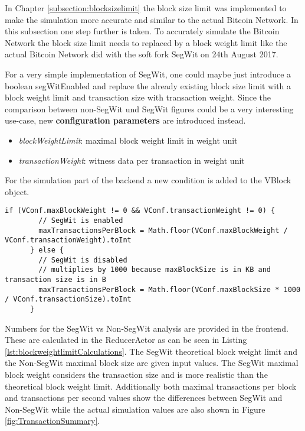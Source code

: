 In Chapter \ref{subsection:blocksizelimit} the block size limit was implemented to make the simulation more accurate and similar to the actual Bitcoin Network. In this subsection one step further is taken. To accurately simulate the Bitcoin Network the block size limit needs to replaced by a block weight limit like the actual Bitcoin Network did with the soft fork SegWit on 24th August 2017.

For a very simple implementation of SegWit, one could maybe just introduce a boolean segWitEnabled and replace the already existing block size limit with a block weight limit and transaction size with transaction weight. Since the comparison between non-SegWit und SegWit figures could be a very interesting use-case, new \textbf{configuration parameters} are introduced instead.

\begin{itemize}
\item \textit{blockWeightLimit}: maximal block weight limit in weight unit
\item \textit{transactionWeight}: witness data per transaction in weight unit
\end{itemize}

For the simulation part of the backend a new condition is added to the VBlock object.

\begin{minipage}{\linewidth}
\begin{lstlisting}[style=myScalastyle,label=lst:blockweightlimit,caption={VBlock with focus on block weight limit}]
      if (VConf.maxBlockWeight != 0 && VConf.transactionWeight != 0) {
        // SegWit is enabled
        maxTransactionsPerBlock = Math.floor(VConf.maxBlockWeight / VConf.transactionWeight).toInt
      } else {
        // SegWit is disabled
        // multiplies by 1000 because maxBlockSize is in KB and transaction size is in B
        maxTransactionsPerBlock = Math.floor(VConf.maxBlockSize * 1000 / VConf.transactionSize).toInt
      }
\end{lstlisting}
\end{minipage}

Numbers for the SegWit vs Non-SegWit analysis are provided in the frontend. These are calculated in the ReducerActor as can be seen in Listing \ref{lst:blockweightlimitCalculations}. The SegWit theoretical block weight limit and the Non-SegWit maximal block size are given input values. The SegWit maximal block weight considers the transaction size and is more realistic than the theoretical block weight limit. Additionally both maximal transactions per block and transactions per second values show the differences between SegWit and Non-SegWit while the actual simulation values are also shown in Figure \ref{fig:TransactionSummary}.

